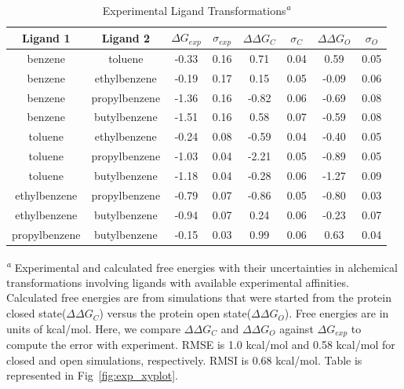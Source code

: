 \begin{table}[!htb]
\centering
\caption{Experimental Ligand Transformations\textsuperscript{\emph{a}}}
\label{tbl:exp_set}
\begin{tabular}{|c|c|c|c|c|c|c|c|}
\hline
\textbf{Ligand 1} & \textbf{Ligand 2}  & \boldmath$\Delta G_{exp}$  & \boldmath$\sigma_{exp}$ & \boldmath$\Delta\Delta G_{C}$ & \boldmath$\sigma_{C}$ & \boldmath$\Delta\Delta G_{O}$ & \boldmath$\sigma_{O}$ \\ \hline
benzene         & toluene         & -0.33        & 0.16            & 0.71       & 0.04          & 0.59       & 0.05          \\ \hline
benzene         & ethylbenzene    & -0.19        & 0.17            & 0.15       & 0.05          & -0.09      & 0.06          \\ \hline
benzene         & propylbenzene & -1.36        & 0.16            & -0.82      & 0.06          & -0.69      & 0.08          \\ \hline
benzene         & butylbenzene  & -1.51        & 0.16            & 0.58       & 0.07          & -0.59      & 0.08          \\ \hline
toluene         & ethylbenzene    & -0.24        & 0.08            & -0.59      & 0.04          & -0.40      & 0.05          \\ \hline
toluene         & propylbenzene & -1.03        & 0.04            & -2.21      & 0.05          & -0.89      & 0.05          \\ \hline
toluene         & butylbenzene  & -1.18        & 0.04            & -0.28      & 0.06          & -1.27       & 0.09         \\ \hline
ethylbenzene    & propylbenzene & -0.79        & 0.07            & -0.86      & 0.05          & -0.80       & 0.03         \\ \hline
ethylbenzene    & butylbenzene  & -0.94        & 0.07            & 0.24       & 0.06          & -0.23      & 0.07          \\ \hline
propylbenzene & butylbenzene  & -0.15        & 0.03            & 0.99       & 0.06          & 0.63       & 0.04          \\ \hline
\end{tabular}

\textsuperscript{\emph{a}} Experimental and calculated free energies with their uncertainties in alchemical transformations involving ligands with available experimental affinities.
Calculated free energies are from simulations that were started from the protein closed state(\boldmath$\Delta\Delta G_{C}$) versus the protein open state(\boldmath$\Delta\Delta G_{O}$). 
Free energies are in units of kcal/mol.
Here, we compare \boldmath$\Delta\Delta G_{C}$ and \boldmath$\Delta\Delta G_{O}$ against \boldmath$\Delta G_{exp}$ to compute the error with experiment.
RMSE is 1.0 kcal/mol and 0.58 kcal/mol for closed and open simulations, respectively.
RMSI is 0.68 kcal/mol.
Table is represented in Fig~\ref{fig:exp_xyplot}.
\end{table}

